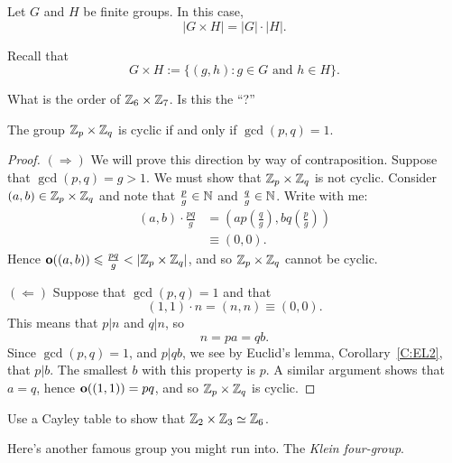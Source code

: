 \documentclass{ximera}
\begin{document}
\begin{lemma}
  Let $G$ and $H$ be finite groups. In this case,
  \[
  |G\times H| = |G|\cdot |H|.
  \]
  \begin{sketch}
    Recall that
    \[
    G\times H := \{(g,h): \text{$g\in G$ and $h\in H$}\}.
    \]
  \end{sketch}
\end{lemma}

\begin{exercise}
  What is the order of $\mathbb Z_6\times\mathbb Z_7$. Is this the
  ``?''
\end{exercise}



\begin{theorem}
  The group $\mathbb Z_p\times \mathbb Z_q$ is cyclic if and only if $\gcd(p,q) =
  1$.
  \begin{proof}
    $(\Rightarrow)$ We will prove this direction by way of
    contraposition. Suppose that $\gcd(p,q) = g>1$. We must show that
    $\mathbb Z_p\times \mathbb Z_q$ is not cyclic. Consider $(a,b)\in\mathbb Z_p\times\mathbb Z_q$
    and note that $\frac{p}{g}\in\mathbb N$ and $\frac{q}{g}\in\mathbb N$. Write
    with me:
    \begin{align*}
      (a,b) \cdot \frac{pq}{g} &= \left(ap\left(\frac{q}{g}\right),bq\left(\frac{p}{g}\right)\right)\\
      &\equiv (0,0).
    \end{align*}
    Hence $\mathbf o((a,b)) \leqslant \frac{pq}{g} < |\mathbb Z_p\times\mathbb Z_q|$, and so
    $\mathbb Z_p\times\mathbb Z_q$ cannot be cyclic.

    $(\Leftarrow)$ Suppose that $\gcd(p,q) = 1$ and that
    \[
    (1,1)\cdot n = (n,n) \equiv (0,0).
    \]
    This means that $p|n$ and $q|n$, so
    \[
    n = pa = qb.
    \]
    Since $\gcd(p,q) = 1$, and $p|qb$, we see by Euclid's lemma,
    Corollary~\ref{C:EL2}, that $p|b$. The smallest $b$ with this
    property is $p$. A similar argument shows that $a = q$, hence
    $\mathbf o((1,1)) = pq$, and so $\mathbb Z_p\times\mathbb Z_q$ is cyclic.
  \end{proof}
\end{theorem}


\begin{exercise}
  Use a Cayley table to show that $\mathbb Z_2\times\mathbb Z_3 \simeq \mathbb Z_6$.
\end{exercise}



Here's another famous group you might run into. The \textit{Klein
  four-group}.
\end{document}
